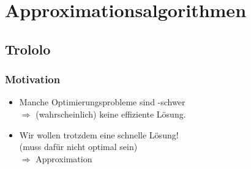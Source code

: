 

\section{Approximationsalgorithmen}
\subsection{Trololo}

\begin{frame}
	\frametitle{Motivation}
	
	\begin{itemize}
		\item Manche Optimierungsprobleme sind \classNP{}-schwer \\ $\Rightarrow$ (wahrscheinlich) keine effiziente Lösung. \pause
		\item Wir wollen trotzdem eine schnelle Lösung! \\ (muss dafür nicht optimal sein) \\ $\Rightarrow$ Approximation

    \vspace{-1cm}
	\end{itemize}
\end{frame}

